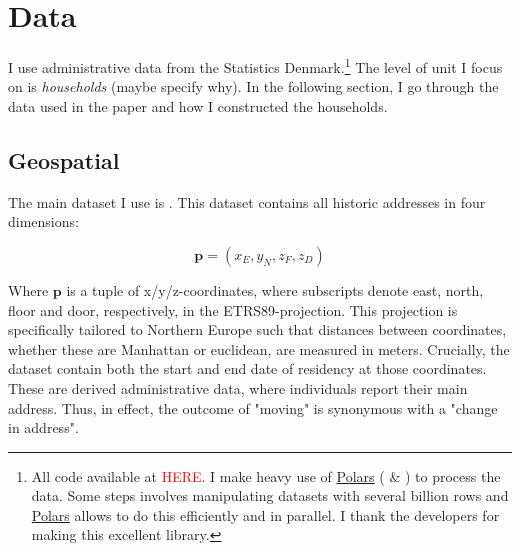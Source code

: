 \documentclass[main.tex]{subfiles}
\begin{document}
\section{Data}
\label{sec:data}
I use administrative data from the Statistics Denmark.\footnote{All code available at \textcolor{red}{HERE}. I make heavy use of \href{https://github.com/pola-rs/polars}{Polars} (\textcite{polars_ritchie_vink_2025} \& \textcite{polars_grouper_van_eechoud}) to process the data. Some steps involves manipulating datasets with several billion rows and \href{https://github.com/pola-rs/polars}{Polars} allows to do this efficiently and in parallel. I thank the developers for making this excellent library.} The level of unit I focus on is \textit{households} (maybe specify why). In the following section, I go through the data used in the paper and how I constructed the households.

\subsection{Geospatial}
\label{sec:data_geospatial}
The main dataset I use is . This dataset contains all historic addresses in four dimensions:

\begin{equation}
    \mathbf{p} = (x_E, y_N, z_F, z_D)
\end{equation}

\noindent
Where $\textbf{p}$ is a tuple of x/y/z-coordinates, where subscripts denote east, north, floor and door, respectively, in the ETRS89-projection. This projection is specifically tailored to Northern Europe such that distances between coordinates, whether these are Manhattan or euclidean, are measured in meters. Crucially, the dataset contain both the start and end date of residency at those coordinates. These are derived administrative data, where individuals report their main address. Thus, in effect, the outcome of "moving" is synonymous with a "change in address". 
\end{document}
